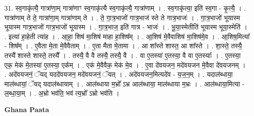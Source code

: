 \documentclass[17pt]{extarticle}
\begin{document}
31. स्व॒गाकृ॑त्यै॒ गात्रा॑णा॒म् गात्रा॑णाꣳ स्व॒गाकृ॑त्यै स्व॒गाकृ॑त्यै॒ गात्रा॑णाम् । . स्व॒गाकृ॑त्या॒ इति॑ स्व॒गा - कृ॒त्यै॒ । . गात्रा॑णाम् ते ते॒ गात्रा॑णा॒म् गात्रा॑णाम् ते । . ते॒ गा॒त्र॒भाजो॑ गात्र॒भाज॑ स्ते ते गात्र॒भाजः॑ । . गा॒त्र॒भाजो॑ भूयास्म भूयास्म गात्र॒भाजो॑ गात्र॒भाजो॑ भूयास्म । . गा॒त्र॒भाज॒ इति॑ गात्र - भाजः॑ । . भू॒या॒स्मेतीति॑ भूयास्म भूया॒स्मेति॑ । . इत्या॑ हा॒हेती त्या॑ह । . आ॒हा॒ शिष॑ मा॒शिष॑ माहा हा॒शिष᳚म् । . आ॒शिष॑ मे॒वैवाशिष॑ मा॒शिष॑मे॒व । . आ॒शिष॒मित्या᳚ - शिष᳚म् । . ए॒वैता मे॒ता मे॒वैवैताम् । . ए॒ता मैता मे॒तामा । . आ शा᳚स्ते शास्त॒ आ शा᳚स्ते । . शा॒स्ते॒ तस्यै॒ तस्यै॑ शास्ते शास्ते॒ तस्यै᳚ । . तस्यै॒ वै वै तस्यै॒ तस्यै॒ वै । . वा ए॒तस्या॑ ए॒तस्या॒ वै वा ए॒तस्याः᳚ । . ए॒तस्या॒ एक॒ मेक॑ मे॒तस्या॑ ए॒तस्या॒ एक᳚म् । . एक॑ मे॒वैवैक॒ मेक॑ मे॒व । . ए॒वा दे॑वयजन॒ मदे॑वयजन मे॒वैवा दे॑वयजनम् । . अदे॑वयजनं॒ ॅयद् यददे॑वयजन॒ मदे॑वयजनं॒ ॅयत् । . अदे॑वयजन॒मित्यदे॑व - य॒ज॒न॒म् । . यदाल॑ब्धाया॒ माल॑ब्धायां॒ ॅयद् यदाल॑ब्धायाम् । . आल॑ब्धाया म॒भ्रो᳚ ऽभ्र आल॑ब्धाया॒ माल॑ब्धाया म॒भ्रः । . आल॑ब्धाया॒मित्या - ल॒ब्धा॒या॒म् । . अ॒भ्रो भव॑ति॒ भव॑ त्य॒भ्रो᳚ ऽभ्रो भव॑ति । \newline

\textbf{Ghana Paata } \newline
\end{document}
